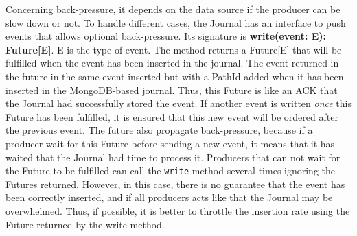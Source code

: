 Concerning back-pressure, it depends on the data source if the producer can be slow down or not. To handle different cases, the Journal has an interface to push events that allows optional back-pressure. Its signature is \textbf{write(event: E): Future[E]}. E is the type of event. The method returns a Future[E] that will be fulfilled when the event has been inserted in the journal. The event returned in the future in the same event inserted but with a PathId added when it has been inserted in the MongoDB-based journal.
Thus, this Future is like an ACK that the Journal had successfully stored the event. If another event is written \textit{once} this Future has been fulfilled, it is ensured
that this new event will be ordered after the previous event. The future also propagate back-pressure, because if a producer wait for this Future before sending a new event, it means that it has waited that the Journal had time to process it. Producers that can not wait for the Future to be fulfilled can call the \verb|write| method several times
ignoring the Futures returned. However, in this case, there is no guarantee that the event has been correctly inserted, and if all producers acts like that the Journal may be overwhelmed. Thus, if possible, it is better to throttle the insertion rate using the Future returned by the write method.


